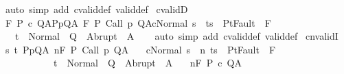\begin{isabellebody}
\ {\isacharparenleft}auto\ simp\ add{\isacharcolon}\ cvalid{\isacharunderscore}def\ valid{\isacharunderscore}def{\isacharparenright}%
\endisatagproof
{\isafoldproof}%
%
\isadelimproof
\isanewline
%
\endisadelimproof
\isanewline
{}\isamarkupfalse%
\ cvalidD{\isacharcolon}\ \isanewline
\ {\isachardoublequoteopen}{\isasymlbrakk}{\isasymGamma}{\isacharcomma}{\isasymTheta}{\isasymTurnstile}\isactrlbsub {\isacharslash}F\isactrlesub \ P\ c\ Q{\isacharcomma}A{\isacharsemicolon}{\isasymforall}{\isacharparenleft}P{\isacharcomma}p{\isacharcomma}Q{\isacharcomma}A{\isacharparenright}{\isasymin}{\isasymTheta}{\isachardot}\ {\isasymGamma}{\isasymTurnstile}\isactrlbsub {\isacharslash}F\isactrlesub \ P\ {\isacharparenleft}Call\ p{\isacharparenright}\ Q{\isacharcomma}A{\isacharsemicolon}{\isasymGamma}{\isasymturnstile}{\isasymlangle}c{\isacharcomma}Normal\ s{\isasymrangle}\ {\isasymRightarrow}\ t{\isacharsemicolon}s\ {\isasymin}\ P{\isacharsemicolon}t{\isasymnotin}Fault\ {\isacharbackquote}\ F{\isasymrbrakk}\ \isanewline
\ \ {\isasymLongrightarrow}\ t\ {\isasymin}\ Normal\ {\isacharbackquote}\ Q\ {\isasymunion}\ Abrupt\ {\isacharbackquote}\ A{\isachardoublequoteclose}\isanewline
%
\isadelimproof
\ \ %
\endisadelimproof
%
\isatagproof
{}\isamarkupfalse%
\ {\isacharparenleft}auto\ simp\ add{\isacharcolon}\ cvalid{\isacharunderscore}def\ valid{\isacharunderscore}def{\isacharparenright}%
\endisatagproof
{\isafoldproof}%
%
\isadelimproof
\isanewline
%
\endisadelimproof
\isanewline
{}\isamarkupfalse%
\ cnvalidI{\isacharcolon}\ \isanewline
\ {\isachardoublequoteopen}{\isasymlbrakk}{\isasymAnd}s\ t{\isachardot}\ {\isasymlbrakk}{\isasymforall}{\isacharparenleft}P{\isacharcomma}p{\isacharcomma}Q{\isacharcomma}A{\isacharparenright}{\isasymin}{\isasymTheta}{\isachardot}\ {\isasymGamma}{\isasymTurnstile}n{\isacharcolon}\isactrlbsub {\isacharslash}F\isactrlesub \ P\ {\isacharparenleft}Call\ p{\isacharparenright}\ Q{\isacharcomma}A{\isacharsemicolon}\isanewline
\ \ \ {\isasymGamma}{\isasymturnstile}{\isasymlangle}c{\isacharcomma}Normal\ s\ {\isasymrangle}\ {\isacharequal}n{\isasymRightarrow}\ t{\isacharsemicolon}s\ {\isasymin}\ P{\isacharsemicolon}t{\isasymnotin}Fault\ {\isacharbackquote}\ F{\isasymrbrakk}\ \isanewline
\ \ \ \ \ \ \ \ \ \ {\isasymLongrightarrow}\ t\ {\isasymin}\ Normal\ {\isacharbackquote}\ Q\ {\isasymunion}\ Abrupt\ {\isacharbackquote}\ A{\isasymrbrakk}\isanewline
\ \ {\isasymLongrightarrow}\ {\isasymGamma}{\isacharcomma}{\isasymTheta}{\isasymTurnstile}n{\isacharcolon}\isactrlbsub {\isacharslash}F\isactrlesub \ P\ c\ Q{\isacharcomma}A{\isachardoublequoteclose}\isanewline

\end{isabellebody}
